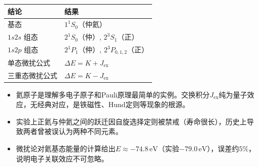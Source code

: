 \begin{formulabox}[答案汇总]
\begin{center}
\begin{tabular}{ll}
\toprule
\textbf{结论} & \textbf{结果} \\
\midrule
基态 & $1^1S_0$（仲氦） \\
$1s2s$ 组态 & $2^1S_0$（仲）, $2^3S_1$（正） \\
$1s2p$ 组态 & $2^1P_1$（仲）, $2^3P_{0,1,2}$（正） \\
单态微扰公式 & $\Delta E=K+J_{\text{ex}}$ \\
三重态微扰公式 & $\Delta E=K-J_{\text{ex}}$ \\
\bottomrule
\end{tabular}
\end{center}
\end{formulabox}

\begin{insightbox}[物理图像]
\begin{itemize}
    \item 氦原子是理解多电子原子和Pauli原理最简单的实例。交换积分$J_{\text{ex}}$纯为量子效应，无经典对应，是铁磁性、Hund定则等现象的根源。
    \item 实验上正氦与仲氦之间的跃迁因自旋选择定则被禁戒（寿命很长），历史上导致两者曾被误认为两种不同元素。
    \item 微扰论对氦基态能量的计算给出$E\approx-74.8\,\text{eV}$（实验$-79.0\,\text{eV}$），误差约$5\%$，说明电子关联效应不可忽略。
\end{itemize}
\end{insightbox}
